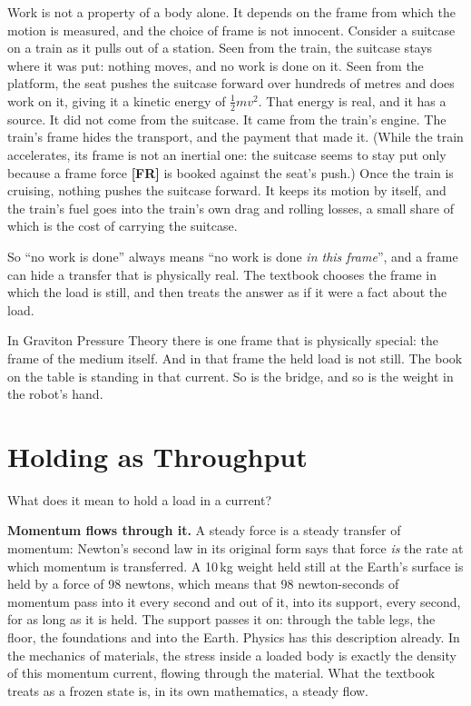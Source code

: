 \documentclass[11pt,a4paper]{article}
\newcommand{\reg}[1]{\textsf{\small\textbf{[#1]}}}
\newcommand{\RFR}{\reg{FR}}
\begin{document}
Work is not a property of a body alone. It depends on the frame from which the motion is measured, and the choice of frame is not innocent. Consider a suitcase on a train as it pulls out of a station. Seen from the train, the suitcase stays where it was put: nothing moves, and no work is done on it. Seen from the platform, the seat pushes the suitcase forward over hundreds of metres and does work on it, giving it a kinetic energy of $\tfrac12 mv^2$. That energy is real, and it has a source. It did not come from the suitcase. It came from the train's engine. The train's frame hides the transport, and the payment that made it. (While the train accelerates, its frame is not an inertial one: the suitcase seems to stay put only because a frame force \RFR{} is booked against the seat's push.) Once the train is cruising, nothing pushes the suitcase forward. It keeps its motion by itself, and the train's fuel goes into the train's own drag and rolling losses, a small share of which is the cost of carrying the suitcase.

So ``no work is done'' always means ``no work is done \emph{in this frame}'', and a frame can hide a transfer that is physically real. The textbook chooses the frame in which the load is still, and then treats the answer as if it were a fact about the load.

In Graviton Pressure Theory there is one frame that is physically special: the frame of the medium itself. And in that frame the held load is not still.  The book on the table is standing in that current. So is the bridge, and so is the weight in the robot's hand.

\section{Holding as Throughput}
\label{sec:throughput}

What does it mean to hold a load in a current?

\textbf{Momentum flows through it.} A steady force is a steady transfer of momentum: Newton's second law in its original form says that force \emph{is} the rate at which momentum is transferred. A 10\,kg weight held still at the Earth's surface is held by a force of 98 newtons, which means that 98 newton-seconds of momentum pass into it every second and out of it, into its support, every second, for as long as it is held. The support passes it on: through the table legs, the floor, the foundations and into the Earth. Physics has this description already. In the mechanics of materials, the stress inside a loaded body is exactly the density of this momentum current, flowing through the material. What the textbook treats as a frozen state is, in its own mathematics, a steady flow.
\end{document}
